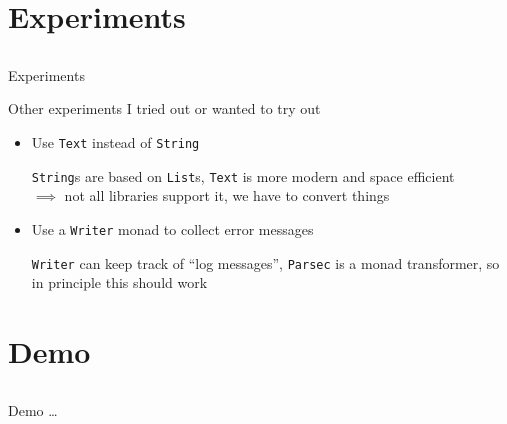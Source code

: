 \documentclass{beamer}
\begin{document}
\section{Experiments}
\subsection*{}

\begin{frame}{Experiments}
  
  Other experiments I tried out or wanted to try out

  \begin{itemize}
    \item Use \verb|Text| instead of \verb|String|

    \verb|String|s are based on \verb|List|s,
    \verb|Text| is more modern and space efficient\\
    $\implies$ not all libraries support it, we have to convert things

    \pause
    \item Use a \verb|Writer| monad to collect error messages

    \verb|Writer| can keep track of ``log messages'',
    \verb|Parsec| is a monad transformer, so in principle this should work
  \end{itemize}

\end{frame}

\section{Demo}
\subsection*{}

\begin{frame}{Demo}
  \ldots
\end{frame}
\end{document}
